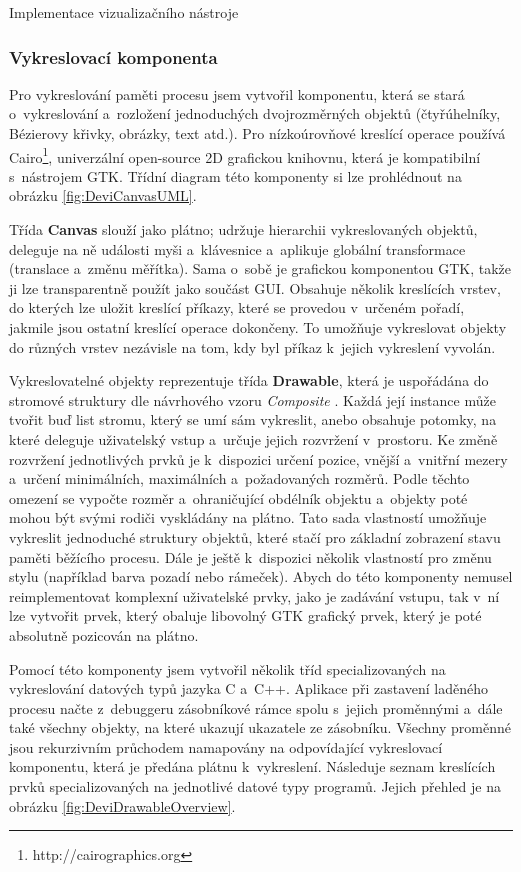\documentclass[czech,bachelor,male,python,dept460,hidelinks]{diploma}						%
\newcommand{\parspace}[1][]{
	\ifthenelse{\isempty{#1}}{\vspace{0mm}}{\vspace{#1}}
	\par
}
\begin{document}
\begin{section}{Implementace vizualizačního nástroje}
	\subsubsection{Vykreslovací komponenta}
	Pro vykreslování paměti procesu jsem vytvořil komponentu, která se stará o~vykreslování a~rozložení jednoduchých dvojrozměrných objektů
	(čtyřúhelníky, Bézierovy křivky, obrázky, text atd.). Pro nízkoúrovňové kreslící operace používá Cairo\footnote{http://cairographics.org}, univerzální
	open-source 2D grafickou knihovnu, která je kompatibilní s~nástrojem GTK. Třídní diagram této komponenty si lze prohlédnout na obrázku
	\ref{fig:DeviCanvasUML}.
	
	
	Třída \textbf{Canvas} slouží jako plátno; udržuje hierarchii vykreslovaných objektů, deleguje na ně události myši a~klávesnice a~aplikuje globální transformace
	(translace a~změnu měřítka). Sama o~sobě je grafickou komponentou GTK, takže ji lze transparentně použít jako součást GUI.
	Obsahuje několik kreslících vrstev, do kterých lze uložit kreslící příkazy, které se provedou v~určeném pořadí, jakmile jsou ostatní kreslící operace dokončeny.
	To umožňuje vykreslovat objekty do různých vrstev nezávisle na tom, kdy byl příkaz k~jejich vykreslení vyvolán.
	
	\parspace Vykreslovatelné objekty reprezentuje třída \textbf{Drawable}, která je uspořádána do stromové struktury dle návrhového vzoru
	\textit{Composite} \cite[183]{gof}. Každá její instance může tvořit buď list stromu, který se umí sám vykreslit, anebo obsahuje potomky, na které deleguje
	uživatelský vstup a~určuje jejich rozvržení v~prostoru. Ke změně rozvržení jednotlivých prvků je k~dispozici určení pozice, vnější a~vnitřní mezery
	a~určení minimálních, maximálních a~požadovaných rozměrů. Podle těchto omezení se vypočte rozměr a~ohraničující obdélník objektu a~objekty poté mohou být
	svými rodiči vyskládány na plátno.
	Tato sada vlastností umožňuje vykreslit jednoduché struktury objektů, které stačí pro základní zobrazení stavu paměti běžícího procesu.
	Dále je ještě k~dispozici několik vlastností pro změnu stylu (například barva pozadí nebo rámeček). Abych do této komponenty
	nemusel reimplementovat komplexní uživatelské prvky, jako je zadávání vstupu, tak v~ní lze vytvořit prvek, který obaluje libovolný GTK grafický prvek,
	který je poté absolutně pozicován na plátno.
	
	\parspace Pomocí této komponenty jsem vytvořil několik tříd specializovaných na vykreslování datových typů jazyka C a~C++. Aplikace při zastavení laděného
	procesu načte z~debuggeru zásobníkové rámce spolu s~jejich proměnnými a~dále také všechny objekty, na které ukazují ukazatele ze zásobníku.
	Všechny proměnné jsou rekurzivním průchodem namapovány na odpovídající vykreslovací komponentu, která je předána plátnu k~vykreslení.
	Následuje seznam kreslících prvků specializovaných na jednotlivé datové typy programů. Jejich přehled je na obrázku \ref{fig:DeviDrawableOverview}.
	

\end{section}
\end{document}
